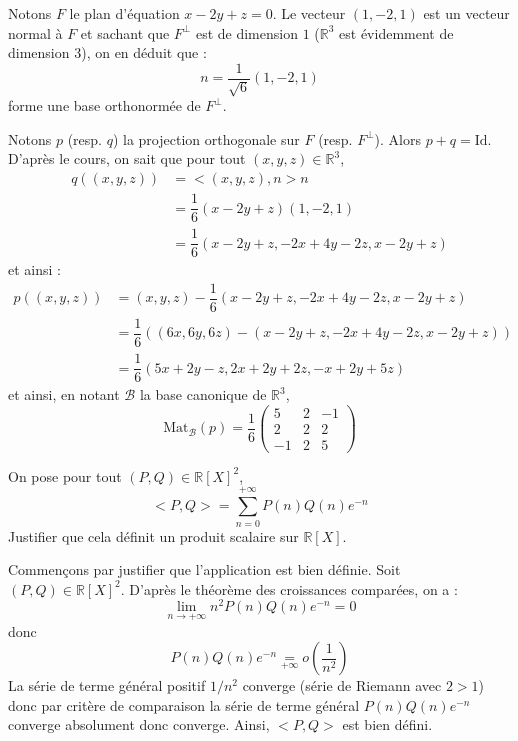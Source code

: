 \documentclass[a4paper,10pt]{report}
\begin{document}
\corr Notons $F$ le plan d'équation $x-2y+z=0$. Le vecteur $(1,-2,1)$ est un vecteur normal à $F$ et sachant que $F^{\perp}$ est de dimension $1$ ($\mathbb{R}^3$ est évidemment de dimension $3$), on en déduit que :
$$ n = \dfrac{1}{\sqrt{6}} (1,-2,1)$$
forme une base orthonormée de $F^{\perp}$. 

\medskip

\noindent Notons $p$ (resp. $q$) la projection orthogonale sur $F$ (resp. $F^{\perp}$). Alors $p+q=\textrm{Id}$. D'après le cours, on sait que pour tout $(x,y,z) \in \mathbb{R}^3$,
\begin{align*}
 q((x,y,z)) & = <(x,y,z),n>n  \\
 & = \dfrac{1}{6} (x-2y+z) (1,-2,1) \\
 & = \dfrac{1}{6} (x-2y+z,-2x+4y-2z,x-2y+z) 
 \end{align*}
 et ainsi :
 \begin{align*}
p((x,y,z)) & = (x,y,z) - \dfrac{1}{6} (x-2y+z,-2x+4y-2z,x-2y+z)  \\
& = \dfrac{1}{6} ( (6x,6y,6z) - (x-2y+z,-2x+4y-2z,x-2y+z)) \\
& = \dfrac{1}{6}(5x+2y-z, 2x+2y+2z,-x+2y+5z)
\end{align*}
et ainsi, en notant $\mathcal{B}$ la base canonique de $\mathbb{R}^3$,
$$ \textrm{Mat}_{\mathcal{B}}(p) = \dfrac{1}{6} \begin{pmatrix}
5 & 2& -1 \\
2 & 2 & 2 \\
-1 & 2& 5
\end{pmatrix}$$



\begin{Exa} On pose pour tout $(P,Q) \in \mathbb{R}[X]^2$,
$$ <P,Q> = \sum_{n=0}^{+ \infty} P(n) Q(n) e^{-n} $$
Justifier que cela définit un produit scalaire sur $\mathbb{R}[X]$.
\end{Exa}

\corr Commençons par justifier que l'application est bien définie. Soit $(P,Q) \in \mathbb{R}[X]^2$. D'après le théorème des croissances comparées, on a :
$$ \lim_{n \rightarrow + \infty} n^2 P(n)Q(n) e^{-n} = 0$$
donc
$$ P(n)Q(n) e^{-n} \underset{+ \infty}{=} o \left( \dfrac{1}{n^2} \right)$$
La série de terme général positif $1/n^2$ converge (série de Riemann avec $2>1$) donc par critère de comparaison la série de terme général $P(n)Q(n) e^{-n}$ converge absolument donc converge. Ainsi, $<P,Q>$ est bien défini.

\medskip
\end{document}
